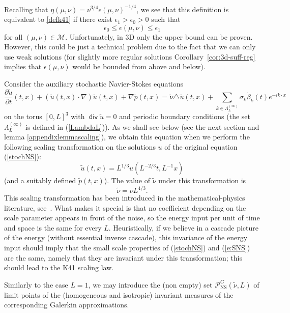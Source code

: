\documentclass[11pt]{preprint}
\DeclareMathOperator{\Div}{\mathsf{div}}
\begin{document}
Recalling that $\eta\left(  \mu,\nu\right)  =\nu^{3/4}\epsilon\left(  \mu
,\nu\right)  ^{-1/4}$, we see that this definition is equivalent to
\ref{defk41} if there exist $\epsilon_{1}>\epsilon_{0}>0$ such that
\[
\epsilon_{0}\leq\epsilon\left(  \mu,\nu\right)  \leq\epsilon_{1}%
\]
for all $(\mu,\nu)\in\mathcal{M}$. Unfortunately, in 3D only the upper
bound can be proven. However, this could be just a technical problem
due to the fact that we can only use weak solutions (for slightly more regular
solutions Corollary~\ref{cor:3d-suff-reg} implies that
$\epsilon\left(  \mu,\nu\right)  $ would be bounded from above and below).

Consider the auxiliary stochastic Navier-Stokes equations
\begin{equation}
\frac{\partial\widetilde{u}}{\partial t}(t,x)+\left(
\widetilde{u}\left(  t,x\right)  \cdot\nabla\right)  \widetilde{u}\left(
t,x\right)  +\nabla\widetilde{p}\left(  t,x\right)
=\tilde{\nu}\triangle\widetilde{u}\left(  t,x\right)  +\sum_{
k\in\Lambda^{(\infty)}_L}\sigma_k{\dot\beta}_k(t)
e^{-ik\cdot x} \label{e:SNS}%
\end{equation}%
on the torus $\left[  0,L\right]  ^{3}$ with $\Div \widetilde{u}=0$ and
periodic boundary conditions (the set $\Lambda^{(\infty)}_L$ is defined in
(\ref{LambdaL})). As we shall see below (see the next section and
lemma \ref{appendixlemmascaling}), we obtain this equation when we perform the
following scaling transformation on the solutions $u$ of the original equation
(\ref{stochNS}):
\[
\widetilde{u}\left(  t,x\right)  =L^{1/3}u(L^{-2/3}t,L^{-1}x)
\]
(and a suitably defined $\widetilde{p}\left(  t,x\right)  $). The value of
$\tilde{\nu}$ under this transformation is
\[
\tilde{\nu}=\nu L^{4/3}.
\]
This scaling transformation has been introduced in the mathematical-physics
literature, see~\cite{Kup}. What makes it special is that no coefficient
depending on the scale parameter appears in front of the noise, so the energy
input per unit of time and space is the same for every $L$. Heuristically, if we
believe in a cascade picture of the energy (without essential inverse
cascade), this invariance of the energy input should imply that the small
scale properties of (\ref{stochNS}) and (\ref{e:SNS}) are the same, namely
that they are invariant under this transformation; this should lead to the K41
scaling law.

Similarly to the case $L=1$, we may introduce the (non empty) set
$\mathcal{P}_{{\mathrm{NS}}}^{G}\left(  \tilde{\nu},L\right)  $ of limit
points of the (homogeneous and isotropic) invariant measures of the
corresponding Galerkin approximations.
\end{document}
